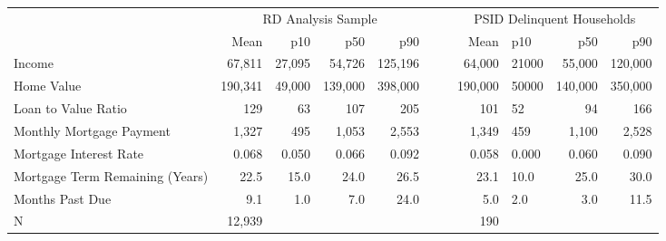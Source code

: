 \begin{tabular}{lrrrrllrlrr}
  \toprule
 \midrule
  & \multicolumn{4}{c}{RD Analysis Sample} & & &\multicolumn{4}{c}{PSID Delinquent Households}\\& Mean & p10 & p50 & p90 &&  & Mean & p10 & p50 & p90\\ \midrule
Income & 67,811 & 27,095 & 54,726 & 125,196 &  &  & 64,000 & 21000 & 55,000 & 120,000 \\ 
  Home Value & 190,341 & 49,000 & 139,000 & 398,000 &  &  & 190,000 & 50000 & 140,000 & 350,000 \\ 
  Loan to Value Ratio & 129 & 63 & 107 & 205 &  &  & 101 & 52 & 94 & 166 \\ 
  Monthly Mortgage Payment & 1,327 & 495 & 1,053 & 2,553 &  &  & 1,349 & 459 & 1,100 & 2,528 \\ 
  Mortgage Interest Rate & 0.068 & 0.050 & 0.066 & 0.092 &  &  & 0.058 & 0.000 & 0.060 & 0.090 \\ 
  Mortgage Term Remaining (Years) & 22.5 & 15.0 & 24.0 & 26.5 &  &  & 23.1 & 10.0 & 25.0 & 30.0 \\ 
  Months Past Due & 9.1 & 1.0 & 7.0 & 24.0 &  &  & 5.0 & 2.0 & 3.0 & 11.5 \\ 
   \midrule
N & 12,939 &  &  &  &  &  & 190 &  &  &  \\ 
   \midrule
 \bottomrule
\end{tabular}
